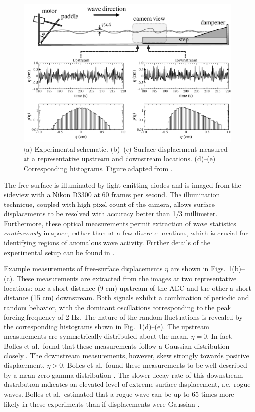 \documentclass[11pt]{article}
\begin{document}
\begin{figure}%
\begin{center}
\includegraphics[width = 0.80 \linewidth]{Figs/ExpDiagStats.pdf}
\caption{
(a) Experimental schematic. 
(b)--(c) Surface displacement measured at a representative upstream and downstream locations. (d)--(e) Corresponding histograms. Figure adapted from \cite{bolles2019}.}
\label{ExpDiagStats}
\end{center}
\end{figure}
 
	The free surface is illuminated by light-emitting diodes and is imaged from the sideview with a Nikon D3300 at 60 frames per second. The illumination technique, coupled with high pixel count of the camera, allows surface displacements to be resolved with accuracy better than 1/3 millimeter. Furthermore, these optical measurements permit extraction of wave statistics {\em continuously} in space, rather than at a few discrete locations, which is crucial for identifying regions of anomalous wave activity. Further details of the experimental setup can be found in \cite{bolles2019}.

	Example measurements of free-surface displacements $\eta$ are shown in Figs.~\ref{ExpDiagStats}(b)--(c). These measurements are extracted from the images at two representative locations: one a short distance (9 cm) upstream of the ADC and the other a short distance (15 cm) downstream. Both signals exhibit a combination of periodic and random behavior, with the dominant oscillations corresponding to the peak forcing frequency of 2 Hz. The nature of the random fluctuations is revealed by the corresponding histograms shown in Fig.~\ref{ExpDiagStats}(d)--(e). The upstream measurements are symmetrically distributed about the mean, $\eta = 0$. In fact, Bolles et al.~found that these measurements follow a Gaussian distribution closely \cite{bolles2019}. The downstream measurements, however, skew strongly towards positive displacement, $\eta > 0$. Bolles et al.~found these measurements to be well described by a mean-zero gamma distribution \cite{bolles2019}. The slower decay rate of this downstream distribution indicates an elevated level of extreme surface displacement, i.e.~rogue waves. Bolles et al.~estimated that a rogue wave can be up to 65 times more likely in these experiments than if displacements were Gaussian \cite{bolles2019}. 
\end{document}
